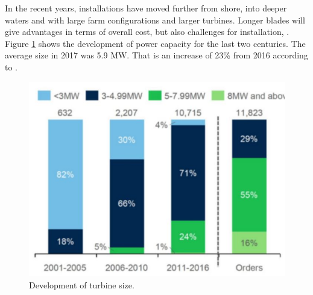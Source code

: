 \noindent In the recent years, installations have moved further from shore, into deeper waters and with large farm configurations and larger turbines.  Longer blades will give advantages in terms of overall cost, but also challenges for installation, \cite{Gao2018}.  Figure \ref{fig:diameter} shows the development of power capacity for the last two centuries. The average size in 2017 was 5.9 MW. That is an increase of 23\% from 2016 according to \cite{we2018}.

\begin{figure}[H]
\centering
\includegraphics[scale=0.7]{figures/diameter}
\caption[$\; \:$Development of turbine size]{Development of turbine size. \cite{Deigen2018}}
 \label{fig:diameter}
\end{figure}

